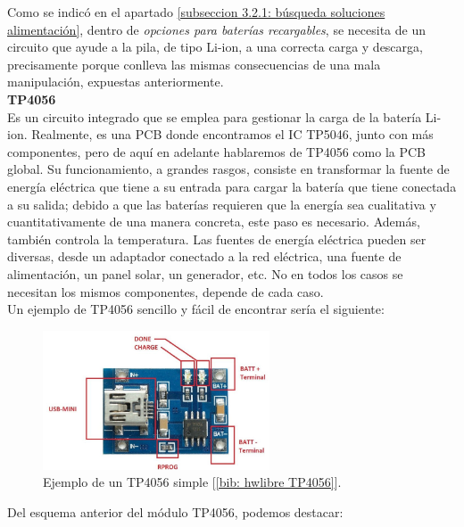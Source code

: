 \documentclass[12pt]{article}
\begin{document}
	\pagebreak
	
	\noindent Como se indicó en el apartado \ref{subseccion 3.2.1: búsqueda soluciones alimentación}, dentro de \textit{opciones para baterías recargables}, se necesita de un circuito que ayude a la pila, de tipo Li-ion, a una correcta carga y descarga, precisamente porque conlleva las mismas consecuencias de una mala manipulación, expuestas anteriormente. \\
		
	\noindent \textbf{TP4056} \\

	\noindent Es un circuito integrado que se emplea para gestionar la carga de la batería Li-ion.  Realmente, es una PCB donde encontramos el IC TP5046, junto con más componentes, pero de aquí en adelante hablaremos de TP4056 como la PCB global. Su funcionamiento, a grandes rasgos, consiste en transformar la fuente de energía eléctrica que tiene a su entrada para cargar la batería que tiene conectada a su salida; debido a que las baterías requieren que la energía sea cualitativa y cuantitativamente de una manera concreta, este paso es necesario. Además, también controla la temperatura. Las fuentes de energía eléctrica pueden ser diversas, desde un adaptador conectado a la red eléctrica, una fuente de alimentación, un panel solar, un generador, etc. No en todos los casos se necesitan los mismos componentes, depende de cada caso.\\
	
	\noindent Un ejemplo de TP4056 sencillo y fácil de encontrar sería el siguiente:  

	\begin{figure}[h]
		\begin{center}
			\includegraphics[width=0.6\textwidth]{img/tp4056_withoutBoost.png}
			\caption{Ejemplo de un TP4056 simple [\ref{bib: hwlibre TP4056}].}
			\label{TP4056 sin boost}
		\end{center}
	\end{figure}
	
	\noindent Del esquema anterior del módulo TP4056, podemos destacar: 
	
\end{document}
